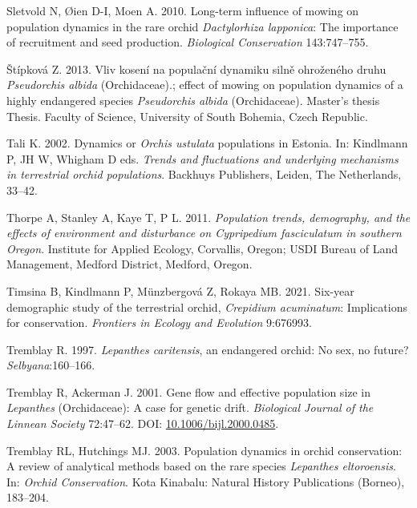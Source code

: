 \documentclass[
  12pt,
  letterpaper,
]{book}
\newlength{\cslhangindent}
\newenvironment{CSLReferences}[2] %
 {\begin{list}{}{%
  \setlength{\itemindent}{0pt}
  \setlength{\leftmargin}{0pt}
  \setlength{\parsep}{0pt}
  \ifodd #1
   \setlength{\leftmargin}{\cslhangindent}
   \setlength{\itemindent}{-1\cslhangindent}
  \fi
  \setlength{\itemsep}{#2\baselineskip}}}
 {\end{list}}
\begin{document}
\begin{CSLReferences}{1}{0}
Sletvold N, Øien D-I, Moen A. 2010. Long-term influence of mowing on
population dynamics in the rare orchid \emph{{D}actylorhiza
{l}apponica}: The importance of recruitment and seed production.
\emph{Biological Conservation} 143:747--755.

Štípková Z. 2013. Vliv kosení na populační dynamiku silně ohroženého
druhu \emph{{P}seudorchis {a}lbida} ({O}rchidaceae).; effect of mowing
on population dynamics of a highly endangered species
\emph{{P}seudorchis {a}lbida} ({O}rchidaceae). Master's thesis Thesis.
Faculty of Science, University of South Bohemia, Czech Republic.

Tali K. 2002. Dynamics or \emph{{O}rchis {u}stulata} populations in
{E}stonia. In: Kindlmann P, JH W, Whigham D eds. \emph{Trends and
fluctuations and underlying mechanisms in terrestrial orchid
populations}. Backhuys Publishers, Leiden, The Netherlands, 33--42.

Thorpe A, Stanley A, Kaye T, P L. 2011. \emph{Population trends,
demography, and the effects of environment and disturbance on
\emph{{C}ypripedium {f}asciculatum} in southern {O}regon}. Institute for
Applied Ecology, Corvallis, Oregon; USDI Bureau of Land Management,
Medford District, Medford, Oregon.

Timsina B, Kindlmann P, Münzbergová Z, Rokaya MB. 2021. Six-year
demographic study of the terrestrial orchid, \emph{{C}repidium
{a}cuminatum}: Implications for conservation. \emph{Frontiers in Ecology
and Evolution} 9:676993.

Tremblay R. 1997. \emph{Lepanthes {c}aritensis}, an endangered orchid:
No sex, no future? \emph{Selbyana}:160--166.

Tremblay R, Ackerman J. 2001. Gene flow and effective population size in
\emph{{L}epanthes} ({O}rchidaceae): A case for genetic drift.
\emph{Biological Journal of the Linnean Society} 72:47--62. DOI:
\href{https://doi.org/10.1006/bijl.2000.0485}{10.1006/bijl.2000.0485}.

Tremblay RL, Hutchings MJ. 2003. Population dynamics in orchid
conservation: A review of analytical methods based on the rare species
\emph{{L}epanthes eltoroensis}. In: \emph{Orchid {C}onservation}. Kota
Kinabalu: Natural History Publications (Borneo), 183--204.


\end{CSLReferences}
\end{document}
